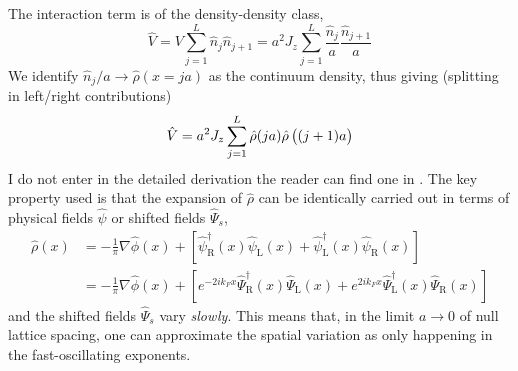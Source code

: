 The interaction term is of the density-density class,
\[
	\hat V = V \sum_{j=1}^L \hat n_j \hat n_{j+1} = a^2 J_z \sum_{j=1}^L \frac{\hat n_j}{a} \frac{\hat n_{j+1}}{a}
\]
We identify $\hat n_j/a \to \hat \rho(x=ja)$ as the continuum density, thus giving (splitting in left/right contributions)
\[
	\hat V = a^2 J_z \sum_{j=1}^L \hat \rho(ja) \hat \rho\left(
		\vphantom{A^A} (j+1)a
	\right)
\]
I do not enter in the detailed derivation the reader can find one in \cite[Sec.~6.1.2]{giamarchi2003quantum}. The key property used is that the expansion of $\hat \rho$ can be identically carried out in terms of physical fields $\hat \psi$ or shifted fields $\hat \Psi_s$,
\[
	\begin{aligned}
		\hat \rho(x) &= - \frac{1}{\pi} \nabla \hat \phi(x) + \left[
			\hat \psi_\mathrm{R}^\dagger(x) \hat \psi_\mathrm{L}(x) + \hat \psi_\mathrm{L}^\dagger(x) \hat \psi_\mathrm{R}(x) 
		\right] \\
		&= - \frac{1}{\pi} \nabla \hat \phi(x) + \left[
			e^{-2ik_F x}
			\hat \Psi_\mathrm{R}^\dagger(x) \hat \Psi_\mathrm{L}(x) + e^{2ik_F x} \hat \Psi_\mathrm{L}^\dagger(x) \hat \Psi_\mathrm{R}(x) 
		\right]
	\end{aligned}
\]
and the shifted fields $\hat \Psi_s$ vary \textit{slowly}. This means that, in the limit $a \to 0$ of null lattice spacing, one can approximate the spatial variation as only happening in the fast-oscillating exponents. \todo